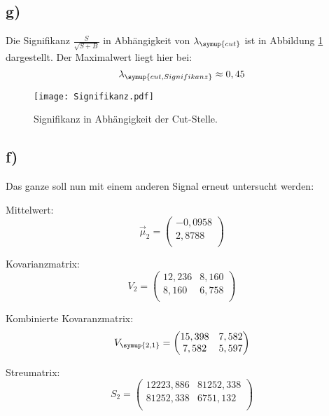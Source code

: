 \subsection{g)}
Die Signifikanz $\frac{S}{\sqrt{S+B}} $ in Abhängigkeit von $\lambda_{\symup{cut}}$ ist in Abbildung
\ref{abb:4} dargestellt.
Der Maximalwert liegt hier bei:
\begin{equation*}
  \lambda_{\symup{cut, Signifikanz}} \approx 0,45
\end{equation*}
\begin{figure}
  \centering
  \texttt{[image: Signifikanz.pdf]}
  \caption{Signifikanz in Abhängigkeit der Cut-Stelle.}
  \label{abb:4}
\end{figure}

\subsection{f)}
Das ganze soll nun mit einem anderen Signal erneut untersucht werden:

Mittelwert:
\begin{equation*}
  \vec{\mu}_2 = \begin{pmatrix}
                  -0,0958\\
                   2,8788\\
  \end{pmatrix}
\end{equation*}

Kovarianzmatrix:
\begin{equation*}
  V_2 = \begin{pmatrix}
                  12,236 &  8,160 \\
                  8,160 &  6,758 \\
  \end{pmatrix}
\end{equation*}

Kombinierte Kovaranzmatrix:
\begin{equation*}
  V_{\symup{2,1}} = \begin{pmatrix}
                  15,398 &  7,582 \\
                  7,582 &  5,597 \\
  \end{pmatrix}
\end{equation*}

Streumatrix:
\begin{equation*}
  S_2 = \begin{pmatrix}
                  12223,886 & 81252,338 \\
                  81252,338 & 6751,132 \\
  \end{pmatrix}
\end{equation*}

